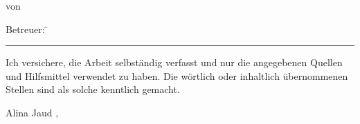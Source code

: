 \begin{titlepage}
{\begin{flushleft}
	\vspace{2cm}\hspace*{-1.7cm}						%
	\parbox[t][3cm][t]{13.5cm}
		{
			\LARGE	
			\centerline{\doctype}
			\centerline{von}
			\centerline{\bfseries\docauthor}
		} 		
\end{flushleft}
	\ifthenelse{\equal{\betreuerII}{}}
	{
		\vspace*{2cm}\hspace*{-1.7cm}
	}
	{
		\vspace*{2cm}\vspace*{-\baselineskip}\hspace*{-1.7cm}
	}
	\parbox[t][1cm][t]{13.5cm}
	{
		\ifthenelse{\equal{\betreuerII}{}}
		{
		}
		{
		\begin{tabbing}
			\Large\sffamily Betreuer: \= \Large\sffamily\bfseries\betreuerI\\
			\> \Large\sffamily\bfseries\betreuerII
		\end{tabbing}
		\vspace*{-\baselineskip}
		}
		\vspace*{0.5cm}
		\hrule
		\vspace*{0.5cm}
		\leftline{\Large\sffamily \monthword{\month}~\the\year}																		
	}
}
\cleardoublepage

\pagestyle{empty}
\vspace*{0.1cm}
Ich versichere, die Arbeit selbständig verfasst und nur die angegebenen Quellen und Hilfsmittel verwendet zu haben. Die wörtlich oder inhaltlich übernommenen Stellen sind als solche kenntlich gemacht. 
\vspace*{3cm}
\begin{center}
Alina Jaud \doclocation, \docdate
\end{center}
\cleardoublepage
\end{titlepage}
